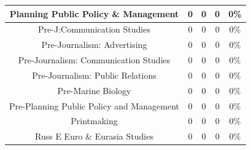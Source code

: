 \documentclass[10]{article}
\begin{document}
\begin{longtable}[c]{|ccccc|}
	\multicolumn{1}{|c|}{Planning Public Policy \& Management}       & \multicolumn{1}{c|}{0}                               & \multicolumn{1}{c|}{0}                                   & \multicolumn{1}{c|}{0}                  & 0\%                   \\ \hline
	\multicolumn{1}{|c|}{Pre-J:Communication Studies}                & \multicolumn{1}{c|}{0}                               & \multicolumn{1}{c|}{0}                                   & \multicolumn{1}{c|}{0}                  & 0\%                   \\ \hline
	\multicolumn{1}{|c|}{Pre-Journalism: Advertising}                & \multicolumn{1}{c|}{0}                               & \multicolumn{1}{c|}{0}                                   & \multicolumn{1}{c|}{0}                  & 0\%                   \\ \hline
	\multicolumn{1}{|c|}{Pre-Journalism: Communication Studies}      & \multicolumn{1}{c|}{0}                               & \multicolumn{1}{c|}{0}                                   & \multicolumn{1}{c|}{0}                  & 0\%                   \\ \hline
	\multicolumn{1}{|c|}{Pre-Journalism: Public Relations}           & \multicolumn{1}{c|}{0}                               & \multicolumn{1}{c|}{0}                                   & \multicolumn{1}{c|}{0}                  & 0\%                   \\ \hline
	\multicolumn{1}{|c|}{Pre-Marine Biology}                         & \multicolumn{1}{c|}{0}                               & \multicolumn{1}{c|}{0}                                   & \multicolumn{1}{c|}{0}                  & 0\%                   \\ \hline
	\multicolumn{1}{|c|}{Pre-Planning Public Policy and Management}  & \multicolumn{1}{c|}{0}                               & \multicolumn{1}{c|}{0}                                   & \multicolumn{1}{c|}{0}                  & 0\%                   \\ \hline
	\multicolumn{1}{|c|}{Printmaking}                                & \multicolumn{1}{c|}{0}                               & \multicolumn{1}{c|}{0}                                   & \multicolumn{1}{c|}{0}                  & 0\%                   \\ \hline
	\multicolumn{1}{|c|}{Russ E Euro \& Eurasia Studies}             & \multicolumn{1}{c|}{0}                               & \multicolumn{1}{c|}{0}                                   & \multicolumn{1}{c|}{0}                  & 0\%                   \\ \hline

\end{longtable}
\end{document}
